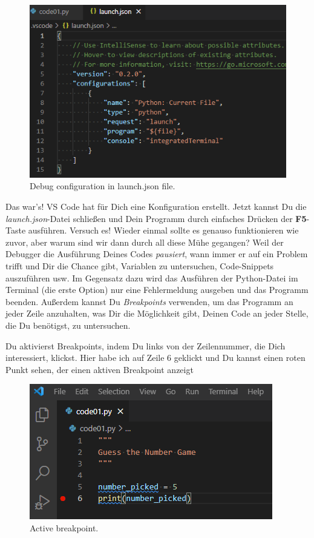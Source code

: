\documentclass[
]{book}
\begin{document}
\begin{figure}
\centering
\includegraphics{images/debug-launch-json.png}
\caption{Debug configuration in launch.json file.}
\end{figure}

Das war's! VS Code hat für Dich eine Konfiguration erstellt. Jetzt kannst Du die \emph{launch.json}-Datei schließen und Dein Programm durch einfaches Drücken der \textbf{F5}-Taste ausführen. Versuch es! Wieder einmal sollte es genauso funktionieren wie zuvor, aber warum sind wir dann durch all diese Mühe gegangen? Weil der Debugger die Ausführung Deines Codes \emph{pausiert}, wann immer er auf ein Problem trifft und Dir die Chance gibt, Variablen zu untersuchen, Code-Snippets auszuführen usw. Im Gegensatz dazu wird das Ausführen der Python-Datei im Terminal (die erste Option) nur eine Fehlermeldung ausgeben und das Programm beenden. Außerdem kannst Du \emph{Breakpoints} verwenden, um das Programm an jeder Zeile anzuhalten, was Dir die Möglichkeit gibt, Deinen Code an jeder Stelle, die Du benötigst, zu untersuchen.

Du aktivierst Breakpoints, indem Du links von der Zeilennummer, die Dich interessiert, klickst. Hier habe ich auf Zeile 6 geklickt und Du kannst einen roten Punkt sehen, der einen aktiven Breakpoint anzeigt

\begin{figure}
\centering
\includegraphics{images/debug-breakpoint.png}
\caption{Active breakpoint.}
\end{figure}
\end{document}
